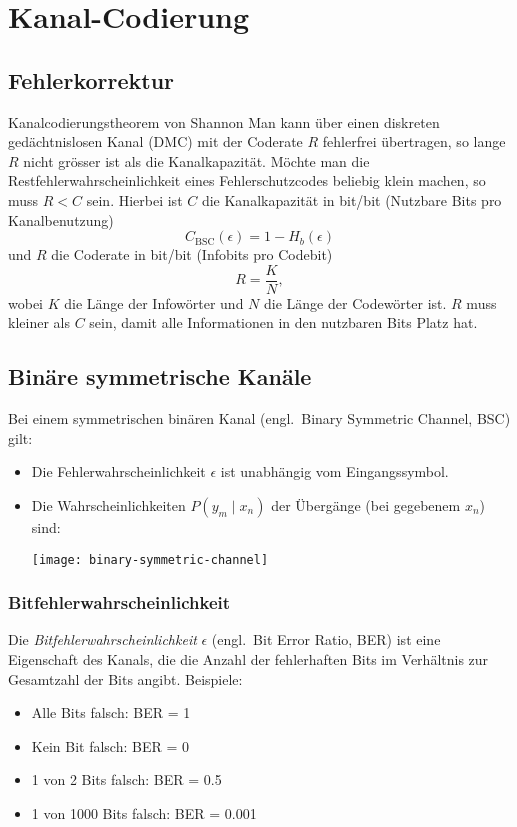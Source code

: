 \section{Kanal-Codierung}\label{sec:kanal-codierung}

\subsection{Fehlerkorrektur}\label{subsec:fehlerkorrektur}

\begin{definition}{Kanalcodierungstheorem von Shannon}
    Man kann über einen diskreten gedächtnislosen Kanal (DMC) mit der Coderate $R$ fehlerfrei übertragen, so lange $R$ nicht grösser ist als die Kanalkapazität.
    Möchte man die Restfehlerwahrscheinlichkeit eines Fehlerschutzcodes beliebig klein machen, so muss $R < C$ sein.
    Hierbei ist $C$ die Kanalkapazität in bit/bit (Nutzbare Bits pro Kanalbenutzung) \[C_{\text{BSC}}(\epsilon) = 1 - H_b(\epsilon)\] und $R$ die Coderate in bit/bit (Infobits pro Codebit) \[R = \frac{K}{N},\] wobei $K$ die Länge der Infowörter und $N$ die Länge der Codewörter ist.
    $R$ muss kleiner als $C$ sein, damit alle Informationen in den nutzbaren Bits Platz hat.
\end{definition}

\subsection{Binäre symmetrische Kanäle}\label{subsec:binaere-symmetrische-kanaele}

Bei einem symmetrischen binären Kanal (engl.\ Binary Symmetric Channel, BSC) gilt:
\begin{itemize}
    \item Die Fehlerwahrscheinlichkeit $\epsilon$ ist unabhängig vom Eingangssymbol.
    \item Die Wahrscheinlichkeiten $P(y_m \mid x_n)$ der Übergänge (bei gegebenem $x_n$) sind:
    \begin{center}
        \texttt{[image: binary-symmetric-channel]}
    \end{center}
\end{itemize}

\subsubsection{Bitfehlerwahrscheinlichkeit}

Die \emph{Bitfehlerwahrscheinlichkeit} $\epsilon$ (engl.\ Bit Error Ratio, BER) ist eine Eigenschaft des Kanals, die die Anzahl der fehlerhaften Bits im Verhältnis zur Gesamtzahl der Bits angibt.
Beispiele:
\begin{multicols}{2}
    \begin{itemize}
        \item Alle Bits falsch: BER = 1
        \item Kein Bit falsch: BER = 0
        \item 1 von 2 Bits falsch: BER = 0.5
        \item 1 von 1000 Bits falsch: BER = 0.001
    \end{itemize}
\end{multicols}

